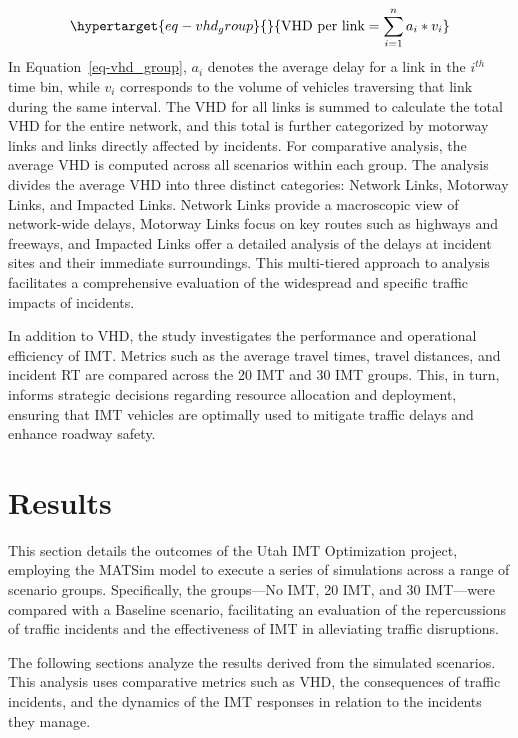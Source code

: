 \documentclass[fancy, oneside, mastersfancy, ms]{byuthesis}
\begin{document}
\begin{equation}\protect\hypertarget{eq-vhd_group}{}{
\text{VHD per link} = {\sum_{i=1}^{n} a_i}*{v_i}
}\label{eq-vhd_group}\end{equation} In Equation~\ref{eq-vhd_group},
\(a_i\) denotes the average delay for a link in the \(i^{th}\) time bin,
while \(v_i\) corresponds to the volume of vehicles traversing that link
during the same interval. The VHD for all links is summed to calculate
the total VHD for the entire network, and this total is further
categorized by motorway links and links directly affected by incidents.
For comparative analysis, the average VHD is computed across all
scenarios within each group. The analysis divides the average VHD into
three distinct categories: Network Links, Motorway Links, and Impacted
Links. Network Links provide a macroscopic view of network-wide delays,
Motorway Links focus on key routes such as highways and freeways, and
Impacted Links offer a detailed analysis of the delays at incident sites
and their immediate surroundings. This multi-tiered approach to analysis
facilitates a comprehensive evaluation of the widespread and specific
traffic impacts of incidents.

In addition to VHD, the study investigates the performance and
operational efficiency of IMT. Metrics such as the average travel times,
travel distances, and incident RT are compared across the 20 IMT and 30
IMT groups. This, in turn, informs strategic decisions regarding
resource allocation and deployment, ensuring that IMT vehicles are
optimally used to mitigate traffic delays and enhance roadway safety.


\hypertarget{sec-results}{%
\chapter{Results}\label{sec-results}}

This section details the outcomes of the Utah IMT Optimization project,
employing the MATSim model to execute a series of simulations across a
range of scenario groups. Specifically, the groups---No IMT, 20 IMT, and
30 IMT---were compared with a Baseline scenario, facilitating an
evaluation of the repercussions of traffic incidents and the
effectiveness of IMT in alleviating traffic disruptions.

The following sections analyze the results derived from the simulated
scenarios. This analysis uses comparative metrics such as VHD, the
consequences of traffic incidents, and the dynamics of the IMT responses
in relation to the incidents they manage.
\end{document}
